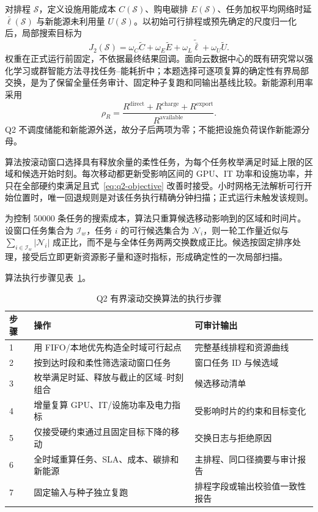 对排程 $\mathcal S$，定义设施用能成本 $C(\mathcal S)$、购电碳排 $E(\mathcal S)$、任务加权平均网络时延 $\bar\ell(\mathcal S)$ 与新能源未利用量 $U(\mathcal S)$。以初始可行排程或预先确定的尺度归一化后，局部搜索目标为
\begin{equation}
  J_2(\mathcal S)=\omega_C\widetilde C+\omega_E\widetilde E
  +\omega_L\widetilde{\bar\ell}+\omega_U\widetilde U.
  \label{eq:q2-objective}
\end{equation}
权重在正式运行前固定，不依据最终结果回调。面向云数据中心的既有研究常以强化学习或群智能方法寻找任务--能耗折中；本题选择可逐项复算的确定性有界局部交换，是为了保留全量任务审计、固定种子复跑和同输出基线比较。新能源利用率采用
\begin{equation}
  \rho_R=\frac{R^{\mathrm{direct}}+R^{\mathrm{charge}}+R^{\mathrm{export}}}{R^{\mathrm{available}}}.
  \label{eq:renewable-utilization}
\end{equation}
Q2 不调度储能和新能源外送，故分子后两项为零；不能把设施负荷误作新能源分母。

算法按滚动窗口选择具有释放余量的柔性任务，为每个任务枚举满足时延上限的区域和候选开始时刻。每次移动都更新受影响区间的 GPU、IT 功率和设施功率，并只在全部硬约束满足且式~\eqref{eq:q2-objective} 改善时接受。小时网格无法解析可行开始位置时，唯一回退规则是对该任务执行精确分钟扫描；正式运行未触发该规则。

为控制 50000 条任务的搜索成本，算法只重算候选移动影响到的区域和时间片。设窗口任务集合为 $\mathcal I_w$，任务 $i$ 的可行候选集合为 $\mathcal N_i$，则一轮工作量近似与 $\sum_{i\in\mathcal I_w}|\mathcal N_i|$ 成正比，而不是与全体任务两两交换数成正比。候选按固定排序处理，接受后立即更新资源影子量和逐时指标，形成确定性的一次局部扫描。

算法执行步骤见表~\ref{tab:q2-algorithm}。

\begin{table}[H]
  \centering
  \caption{Q2 有界滚动交换算法的执行步骤}
  \label{tab:q2-algorithm}
  \small
  \begin{tabularx}{\textwidth}{p{}p{}X}
    \toprule
    步骤 & 操作 & 可审计输出 \\
    \midrule
    1 & 用 FIFO/本地优先构造全时域可行起点 & 完整基线排程和资源曲线 \\
    2 & 按到达时段和柔性筛选滚动窗口任务 & 窗口任务 ID 与候选域 \\
    3 & 枚举满足时延、释放与截止的区域--时刻组合 & 候选移动清单 \\
    4 & 增量复算 GPU、IT/设施功率及电力指标 & 受影响时片的约束和目标变化 \\
    5 & 仅接受硬约束通过且固定目标下降的移动 & 交换日志与拒绝原因 \\
    6 & 全时域重算任务、SLA、成本、碳排和新能源 & 主排程、同口径摘要与审计报告 \\
    7 & 固定输入与种子独立复跑 & 排程字段或输出校验值一致性报告 \\
    \bottomrule
  \end{tabularx}
\end{table}

